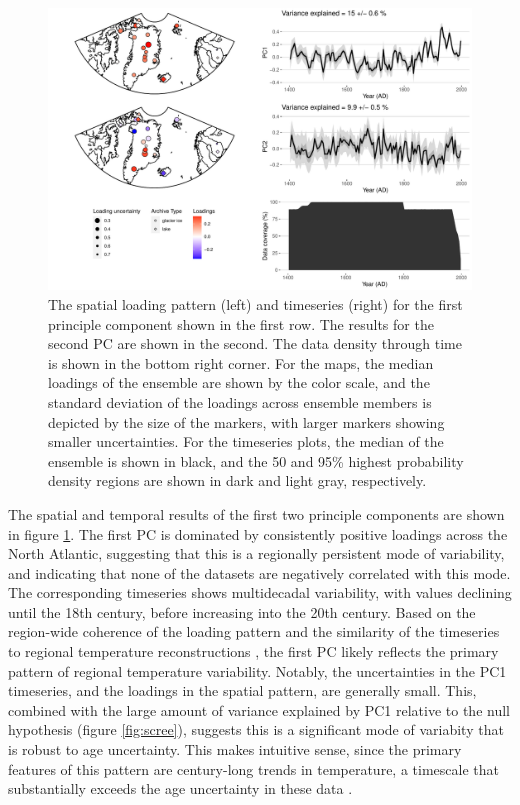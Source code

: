 \documentclass[gchron, manuscript]{copernicus}
\begin{document}
\begin{figure}
\includegraphics[width=12cm]{geoChronR-paper_files/figure-latex/pca-1} \caption{The spatial loading pattern (left) and timeseries (right) for the first principle component shown in the first row. The results for the second PC are shown in the second. The data density through time is shown in the bottom right corner. For the maps, the median loadings of the ensemble are shown by the color scale, and the standard deviation of the loadings across ensemble members is depicted by the size of the markers, with larger markers showing smaller uncertainties. For the timeseries plots, the median of the ensemble is shown in black, and the 50 and 95\% highest probability density regions are shown in dark and light gray, respectively.}\label{fig:pca}
\end{figure}

The spatial and temporal results of the first two principle components are shown in figure \ref{fig:pca}.
The first PC is dominated by consistently positive loadings across the North Atlantic, suggesting that this is a regionally persistent mode of variability, and indicating that none of the datasets are negatively correlated with this mode.
The corresponding timeseries shows multidecadal variability, with values declining until the 18th century, before increasing into the 20th century.
Based on the region-wide coherence of the loading pattern and the similarity of the timeseries to regional temperature reconstructions \citep{paico, McKayKaufman2014, werner2018arcticCFR}, the first PC likely reflects the primary pattern of regional temperature variability.
Notably, the uncertainties in the PC1 timeseries, and the loadings in the spatial pattern, are generally small.
This, combined with the large amount of variance explained by PC1 relative to the null hypothesis (figure \ref{fig:scree}), suggests this is a significant mode of variabity that is robust to age uncertainty.
This makes intuitive sense, since the primary features of this pattern are century-long trends in temperature, a timescale that substantially exceeds the age uncertainty in these data \citep{McKayKaufman2014}.
\end{document}
